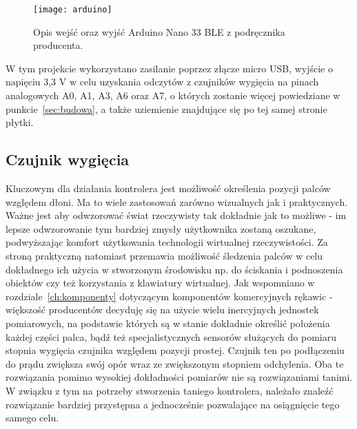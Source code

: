 \begin{figure}[h]
\centering
\texttt{[image: arduino]}
\caption{Opis wejść oraz wyjść Arduino Nano 33 BLE z podręcznika producenta.}
\label{fig:arduino}
\end{figure}

	W tym projekcie wykorzystano zasilanie poprzez złącze micro USB, wyjście o napięciu 3,3 V w celu uzyskania odczytów z czujników wygięcia na pinach analogowych A0, A1, A3, A6 oraz A7, o których zostanie więcej powiedziane w punkcie~\ref{sec:budowa}, a także uziemienie znajdujące się po tej samej stronie płytki.

	\subsection{Czujnik wygięcia}
	\label{subsec:wygiecie}	
	Kluczowym dla działania kontrolera jest możliwość określenia pozycji palców względem dłoni. Ma to wiele zastosowań zarówno wizualnych jak i praktycznych. Ważne jest aby odwzorować świat rzeczywisty tak dokładnie jak to możliwe - im lepsze odwzorowanie tym bardziej zmysły użytkownika zostaną oszukane, podwyższając komfort użytkowania technologii wirtualnej rzeczywistości. Za stroną praktyczną natomiast przemawia możliwość śledzenia palców w celu dokładnego ich użycia w stworzonym środowisku np. do ściskania i podnoszenia obiektów czy też korzystania z klawiatury wirtualnej. Jak wspomniano w rozdziale~\ref{ch:komponenty} dotyczącym komponentów komercyjnych rękawic - większość producentów decyduję się na użycie wielu inercyjnych jednostek pomiarowych, na podstawie których są w stanie dokładnie określić położenia każdej części palca, bądź też specjalistycznych sensorów służących do pomiaru stopnia wygięcia czujnika względem pozycji prostej. 
Czujnik ten po podłączeniu do prądu zwiększa swój opór wraz ze zwiększonym stopniem odchylenia. Oba te rozwiązania pomimo wysokiej dokładności pomiarów nie są rozwiązaniami tanimi. W związku z tym na potrzeby stworzenia taniego kontrolera, należało znaleźć rozwiązanie bardziej przystępna a jednocześnie pozwalające na osiągnięcie tego samego celu.
	
